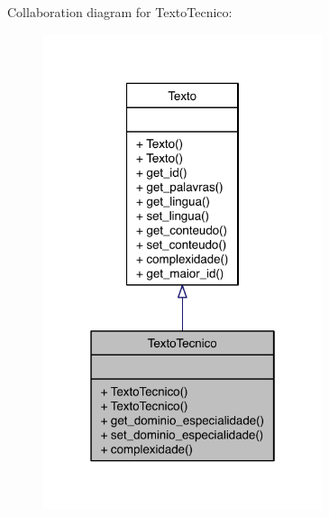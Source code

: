 Collaboration diagram for Texto\-Tecnico\-:
\nopagebreak
\begin{figure}[H]
\begin{center}
\leavevmode
\includegraphics[width=232pt]{class_texto_tecnico__coll__graph}
\end{center}
\end{figure}
